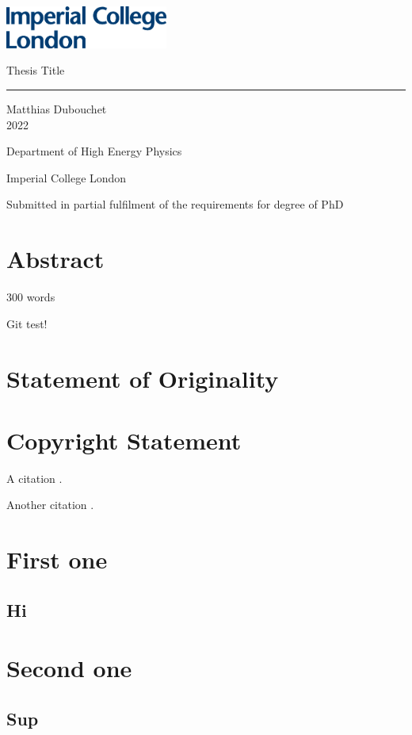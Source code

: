 \documentclass[11pt, a4paper, twoside]{report}
\begin{document}
\includegraphics[width=0.4\textwidth]{IMP_ML_1CS_4CP.eps}
\vfill
\begin{center}
    
    {\huge Thesis Title}
    
    \rule{7cm}{1pt}
    \vspace{2cm}
    
    Matthias Dubouchet\\
    2022
    \vspace{2cm}
    
    Department of High Energy Physics
    
    Imperial College London
    \vspace{2cm}
    
    Submitted in partial fulfilment of the requirements for degree of PhD
    
\end{center}

\vfill
\clearpage

\tableofcontents
\listoffigures
\listoftables
\printglossary[type=\acronymtype]

\chapter*{Abstract}

300 words

Git test!

\blindtext

\chapter*{Statement of Originality}
\blindtext

\chapter*{Copyright Statement}








A citation \cite{butter_how_2019}.

Another citation \cite{butter_how_2019}.

\appendix
\chapter{First one}
\section{Hi}
\chapter{Second one}
\section{Sup}

\printbibliography
\end{document}
